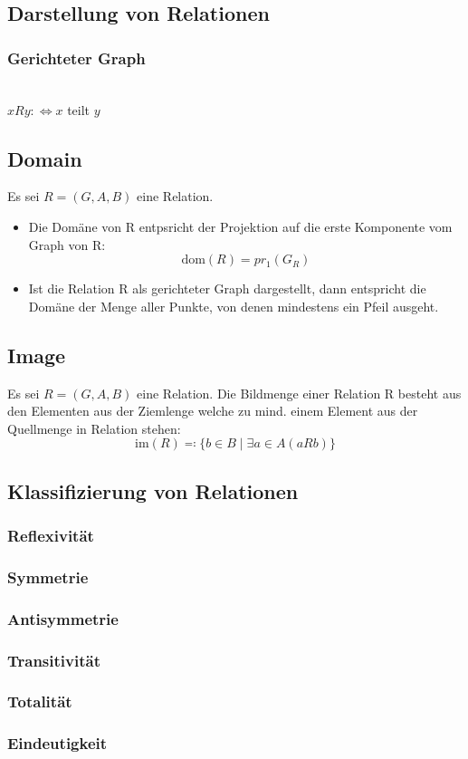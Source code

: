 \subsection{Darstellung von Relationen}
\subsubsection{Gerichteter Graph}
\Nikolaus{}
\\$xRy: \Leftrightarrow x$ teilt $y$
\subsection{Domain}
Es sei $R = (G,A,B)$ eine Relation.
\begin{itemize}
    \item Die Domäne von R entpsricht der Projektion auf die erste Komponente vom Graph von R:
    \begin{equation}
        \text{dom}(R) = pr_{1}(G_R)
    \end{equation}
    \item Ist die Relation R als gerichteter Graph dargestellt, dann
    entspricht die Domäne der Menge aller Punkte, von denen
    mindestens ein Pfeil ausgeht.
\end{itemize}
\subsection{Image}
Es sei $R = (G,A,B)$ eine Relation. Die Bildmenge einer Relation R besteht aus den Elementen aus der Ziemlenge
welche zu  mind. einem Element aus der Quellmenge in Relation stehen:
\begin{equation}
    \text{im}(R) \eqqcolon \{b \in B \mid \exists{a} \in A (aRb)\}
\end{equation}

\subsection{Klassifizierung von Relationen} 
\subsubsection{Reflexivität}
\subsubsection{Symmetrie}
\subsubsection{Antisymmetrie}
\subsubsection{Transitivität} 
\subsubsection{Totalität}
\subsubsection{Eindeutigkeit}
